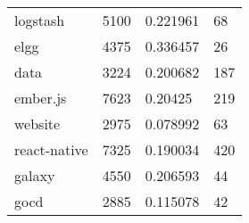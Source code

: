 \begin{table*}[]
\begin{tabular}{llll}
logstash                            & 5100                               & 0.221961                                                                                                          & 68                                                                                                            \\
elgg                                   & 4375                               & 0.336457                                                                                                          & 26                                                                                                            \\
data                                & 3224                               & 0.200682                                                                                                          & 187                                                                                                           \\
ember.js                            & 7623                               & 0.20425                                                                                                           & 219                                                                                                           \\
website                             & 2975                               & 0.078992                                                                                                          & 63                                                                                                            \\
react-native                       & 7325                               & 0.190034                                                                                                          & 420                                                                                                           \\
galaxy                        & 4550                               & 0.206593                                                                                                          & 44                                                                                                            \\
gocd                                   & 2885                               & 0.115078                                                                                                          & 42                                                                                                            \\

\end{tabular}
\end{table*}
